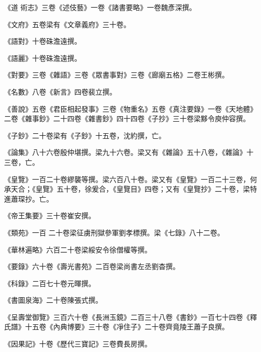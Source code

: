\begin{pinyinscope}
 《道
 術志》三卷《述伎藝》一卷《諸書要略》一卷魏彥深撰。



 《文府》五卷梁有《文章義府》三十卷。



 《語對》十卷硃澹遠撰。



 《語麗》十卷硃澹遠撰。



 《對要》三卷《雜語》三卷《眾書事對》三卷《廊廟五格》二卷王彬撰。



 《名數》八卷《新言》四卷裴立撰。



 《善說》五卷《君臣相起發事》三卷《物重名》五卷《真注要錄》一卷《天地體》二卷《雜事鈔》二十四卷《雜書鈔》四十四卷《子抄》三十卷梁黟令庾仲容撰。



 《子鈔》二十卷梁有《子鈔》十五卷，沈約撰，亡。



 《論集》八十六卷殷仲堪撰。梁九十六卷。梁又有《雜論》五十八卷，《雜論》十三卷，亡。



 《皇覽》一百二十卷繆襲等撰。梁六百八十卷。梁又有《皇覽》一百二十三卷，何承天合；《皇覽》五十卷，徐爰合，《皇覽目》四卷；又有《皇覽抄》二十卷，梁特進蕭琛抄。亡。



 《帝王集要》三十卷崔安撰。



 《類苑》一百
 二十卷梁征虜刑獄參軍劉孝標撰。梁《七錄》八十二卷。



 《華林遍略》六百二十卷梁綏安令徐僧權等撰。



 《要錄》六十卷《壽光書苑》二百卷梁尚書左丞劉杳撰。



 《科錄》二百七十卷元暉撰。



 《書圖泉海》二十卷陳張式撰。



 《呈壽堂御覽》三百六十卷《長洲玉鏡》二百三十八卷《書鈔》一百七十四卷《釋氏譜》十五卷《內典博要》三十卷《凈住子》二十卷齊竟陵王蕭子良撰。



 《因果記》十卷《歷代三寶記》三卷費長房撰。




\end{pinyinscope}
